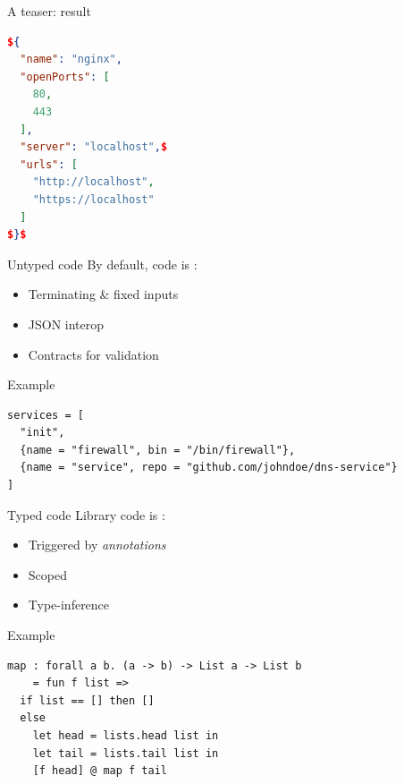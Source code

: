 \documentclass[t, aspectratio=169]{beamer}
\newcommand{\couleur}[2]{{\color{#1}{#2}}}
\begin{document}
\begin{frame}[fragile]{A teaser: result}
\begin{lstlisting}[language=Json,title={nginx.json}]
${
  "name": "nginx",
  "openPorts": [
    80,
    443
  ],
  "server": "localhost",$
  "urls": [
    "http://localhost",
    "https://localhost"
  ]
$}$
\end{lstlisting}
\end{frame}

\begin{frame}[fragile]{Untyped code}
    By default, code is \couleur{pink-froly}{untyped}:
    \begin{itemize}
        \item Terminating \& fixed inputs
        \item JSON interop
        \item Contracts for validation
    \end{itemize}

    \begin{exampleblock}{Example}
\begin{lstlisting}[language=Nickel]
services = [
  "init",
  {name = "firewall", bin = "/bin/firewall"},
  {name = "service", repo = "github.com/johndoe/dns-service"}
]
\end{lstlisting}
    \end{exampleblock}
\end{frame}

\begin{frame}[fragile]{Typed code}
    Library code is \couleur{blue-portage}{statically typed}:
    \begin{itemize}
        \item Triggered by \emph{annotations}
        \item Scoped
        \item Type-inference
    \end{itemize}

\begin{exampleblock}{Example}
   \begin{lstlisting}[language=Nickel]
map : forall a b. (a -> b) -> List a -> List b
    = fun f list =>
  if list == [] then []
  else
    let head = lists.head list in
    let tail = lists.tail list in
    [f head] @ map f tail
\end{lstlisting}
\end{exampleblock}
\end{frame}
\end{document}
